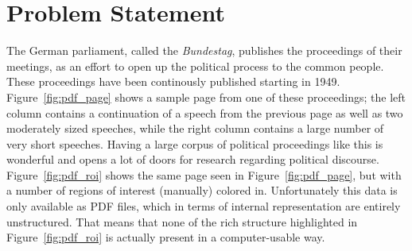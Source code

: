 \section{Problem Statement}
\label{sec:problem}
The German parliament, called the \emph{Bundestag}, publishes the proceedings of
their meetings, as an effort to open up the political process to the common
people. These proceedings have been continously published starting in 1949.
Figure~\ref{fig:pdf_page} shows a sample page from one of these proceedings; the
left column contains a continuation of a speech from the previous page as well
as two moderately sized speeches, while the right column contains a large number
of very short speeches. Having a large corpus of political proceedings like this
is wonderful and opens a lot of doors for research regarding political
discourse. Figure~\ref{fig:pdf_roi} shows the same page seen in
Figure~\ref{fig:pdf_page}, but with a number of regions of interest (manually)
colored in. Unfortunately this data is only available as PDF files, which in
terms of internal representation are entirely unstructured. That means that none
of the rich structure highlighted in Figure~\ref{fig:pdf_roi} is actually
present in a computer-usable way.


